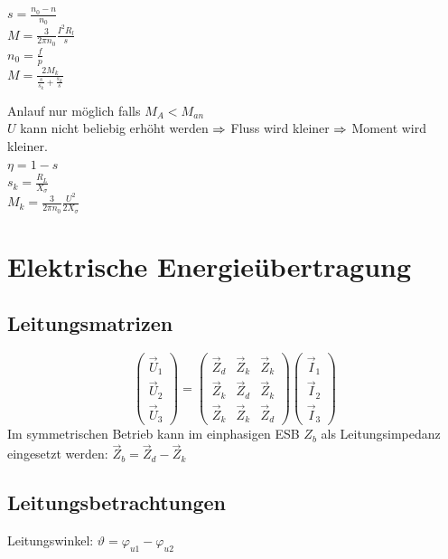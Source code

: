\documentclass[fs, footer]{latex4ei}
\begin{document}
\begin{multicols}{4}
		 $s = \frac{n_0 - n}{n_0}$ \\
		 $M = \frac{3}{2 \pi n_0} \frac{I^2 R_l}{s}$ \\
		 $n_0 = \frac{f}{p}$ \\
		 $M = \frac{2 M_k}{\frac{s}{s_k} + \frac{s_k}{s}}$


		Anlauf nur möglich falls $M_A < M_{an}$\\
		$U$ kann nicht beliebig erhöht werden $\Rightarrow$ Fluss wird kleiner $\Rightarrow$ Moment wird kleiner.\\
		
		$\eta = 1 - s$ \\
		$s_k = \frac{R_L}{X_\sigma}$ \\
		$M_k = \frac{3}{2 \pi n_0} \frac{U^2}{2 X_\sigma}$
		
		
	\section{Elektrische Energieübertragung}
	
		\subsection{Leitungsmatrizen}
		
		
		\[\begin{pmatrix} \vec U_1 \\ \vec U_2 \\ \vec U_3 \end{pmatrix} = \begin{pmatrix} \vec Z_d & \vec Z_k & \vec Z_k \\ \vec Z_k & \vec Z_d & \vec Z_k \\ \vec Z_k & \vec Z_k & \vec Z_d \end{pmatrix} \begin{pmatrix} \vec I_1 \\ \vec I_2 \\ \vec I_3 \end{pmatrix}\]
		Im symmetrischen Betrieb kann im einphasigen ESB $Z_b$ als Leitungsimpedanz eingesetzt werden: $\vec Z_b = \vec Z_d - \vec Z_k$
		
		\subsection{Leitungsbetrachtungen}

		Leitungswinkel: $\vartheta = \varphi_{u1} - \varphi_{u2}$



\end{multicols}
\end{document}
